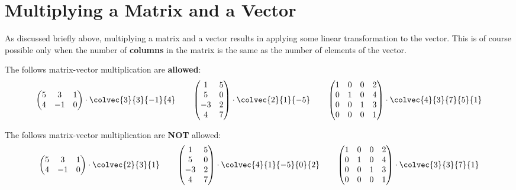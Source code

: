 \section{Multiplying a Matrix and a Vector}
As discussed briefly above, multiplying a matrix and a vector results in applying some linear transformation to the vector. This is of course possible only when the number of \textbf{columns} in the matrix is the same as the number of elements of the vector.
\begin{example}
  
  The follows matrix-vector multiplication are \textbf{allowed}:
  \begin{equation*}
	\begin{pmatrix}
	  5 & 3 & 1\\
	  4 & -1 & 0
	\end{pmatrix}\cdot\colvec{3}{3}{-1}{4}\qquad
	\begin{pmatrix}
	  1 & 5 \\
	  5 & 0 \\
	  -3 & 2\\
	  4 & 7
	\end{pmatrix}\cdot\colvec{2}{1}{-5}\qquad
	\begin{pmatrix}
	  1 & 0 & 0 & 2\\
	  0 & 1 & 0 & 4\\
	  0 & 0 & 1 & 3\\
	  0 & 0 & 0 & 1\\
	\end{pmatrix}\cdot\colvec{4}{3}{7}{5}{1}
  \end{equation*}
  
  The follows matrix-vector multiplication are \textbf{NOT} allowed:
  \begin{equation*}
	\begin{pmatrix}
	  5 & 3 & 1\\
	  4 & -1 & 0
	\end{pmatrix}\cdot\colvec{2}{3}{1}\qquad
	\begin{pmatrix}
	  1 & 5 \\
	  5 & 0 \\
	  -3 & 2\\
	  4 & 7
	\end{pmatrix}\cdot\colvec{4}{1}{-5}{0}{2}\qquad
	\begin{pmatrix}
	  1 & 0 & 0 & 2\\
	  0 & 1 & 0 & 4\\
	  0 & 0 & 1 & 3\\
	  0 & 0 & 0 & 1\\
	\end{pmatrix}\cdot\colvec{3}{3}{7}{1}
  \end{equation*}
\end{example}
 
